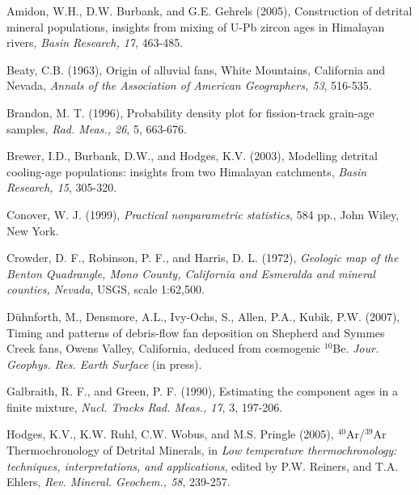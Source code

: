 \documentclass[12pt,twoside]{article}
\begin{document}
\begin{description}
  
\item Amidon,  W.H., D.W. Burbank,  and G.E. Gehrels (2005),  Construction of
  detrital mineral  populations, insights  from mixing of  U-Pb zircon
  ages in Himalayan rivers, {\it Basin Research, 17}, 463-485.
  
\item Beaty,  C.B. (1963), Origin  of alluvial fans,  White Mountains,
  California and  Nevada, {\it Annals  of the Association  of American
    Geographers, 53}, 516-535.

\item Brandon, M. T. (1996), Probability density plot for fission-track
grain-age samples, {\it Rad. Meas., 26}, 5, 663-676.

\item Brewer, I.D., Burbank,  D.W., and Hodges, K.V. (2003), Modelling
  detrital  cooling-age  populations:   insights  from  two  Himalayan
  catchments, {\it Basin Research, 15}, 305-320.
  
\item   Conover,   W.  J.    (1999),   {\it  Practical   nonparametric
    statistics}, 584 pp., John Wiley, New York.
  
\item Crowder,  D.  F., Robinson, P.   F., and Harris,  D. L.  (1972),
  {\it Geologic map of  the Benton Quadrangle, Mono County, California
    and Esmeralda and mineral counties, Nevada}, USGS, scale 1:62,500.
  
\item D\"{u}hnforth,  M., Densmore,  A.L., Ivy-Ochs, S.,  Allen, P.A.,
  Kubik,  P.W.   (2007),  Timing  and  patterns   of  debris-flow  fan
  deposition  on  Shepherd  and   Symmes  Creek  fans,  Owens  Valley,
  California, deduced from cosmogenic  $^{10}$Be. {\it Jour.  Geophys. 
    Res. Earth Surface} (in press).
  
\item Galbraith,  R.  F.,  and Green, P.   F.  (1990),  Estimating the
  component ages in  a finite mixture, {\it Nucl.   Tracks Rad. Meas.,
    17}, 3, 197-206.
  
\item Hodges, K.V.,  K.W. Ruhl, C.W. Wobus, and  M.S.  Pringle (2005),
  $^{40}$Ar/$^{39}$Ar Thermochronology  of Detrital Minerals,  in {\it
    Low temperature thermochronology: techniques, interpretations, and
    applications},  edited by  P.W.  Reiners,  and T.A.   Ehlers, {\it
    Rev. Mineral. Geochem., 58}, 239-257.
  

\end{description}
\end{document}

